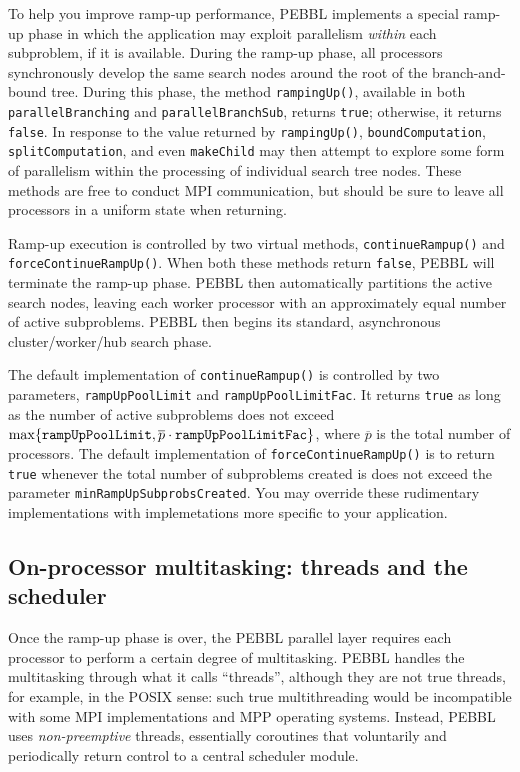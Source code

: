 To help you improve ramp-up performance, PEBBL implements
a special ramp-up phase in which the application may exploit
parallelism \emph{within} each subproblem, if it is available.  During
the ramp-up phase, all processors synchronously develop the same
search nodes around the root of the branch-and-bound tree.  During
this phase, the method \texttt{rampingUp()}, available in both
\texttt{parallelBranching} and \texttt{parallelBranchSub}, returns
\texttt{true}; otherwise, it returns \texttt{false}.  In response to
the value returned by \texttt{rampingUp()}, \texttt{boundComputation},
\texttt{splitComputation}, and even \texttt{makeChild} may then
attempt to explore some form of parallelism within the processing of
individual search tree nodes.  These methods are free to conduct
MPI communication, but should be sure to leave all
processors in a uniform state when returning.

Ramp-up execution is controlled by two virtual methods,
\texttt{continueRampup()} and
\texttt{force\linebreak[0]ContinueRampUp()}.  When both these methods
return \texttt{false}, PEBBL will terminate the ramp-up phase.  PEBBL
then automatically partitions the active search nodes, leaving each
worker processor with an approximately equal number of active
subproblems.  PEBBL then begins its standard, asynchronous
cluster/worker/hub search phase.

The default implementation of \texttt{continueRampup()} is controlled
by two parameters, \texttt{ramp\linebreak[0]UpPoolLimit} and
\texttt{rampUpPoolLimitFac}.  It returns \texttt{true} as long as the
number of active subproblems does not exceed $\max\{\mbox{\tt
rampUpPoolLimit}, \overline{p}\cdot\mbox{\tt rampUpPoolLimitFac}\}$,
where $\overline{p}$ is the total number of processors.  The default
implementation of \texttt{forceContinueRampUp()} is to return
\texttt{true} whenever the total number of subproblems created is does
not exceed the parameter \texttt{minRampUpSubprobsCreated}.  You may
override these rudimentary implementations with implemetations more
specific to your application.


\subsection{On-processor multitasking: threads and the scheduler}

Once the ramp-up phase is over, the PEBBL parallel layer requires each
processor to perform a certain degree of multitasking.  PEBBL handles
the multitasking through what it calls ``threads'', although they are
not true threads, for example, in the POSIX sense: such true
multithreading would be incompatible with some MPI implementations and
MPP operating systems.  Instead, PEBBL uses \emph{non-preemptive}
threads, essentially coroutines that voluntarily and periodically
return control to a central scheduler module.

